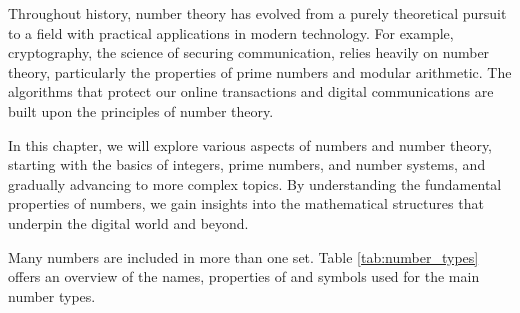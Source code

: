 Throughout history, number theory has evolved from a purely theoretical pursuit to a field with practical applications in modern technology. For example, cryptography, the science of securing communication, relies heavily on number theory, particularly the properties of prime numbers and modular arithmetic. The algorithms that protect our online transactions and digital communications are built upon the principles of number theory.

In this chapter, we will explore various aspects of numbers and number theory, starting with the basics of integers, prime numbers, and number systems, and gradually advancing to more complex topics. By understanding the fundamental properties of numbers, we gain insights into the mathematical structures that underpin the digital world and beyond.

\begin{remark}
Many numbers are included in more than one set. Table \ref{tab:number_types} offers an overview of the names, properties of and symbols used for the main number types.
\end{remark}

